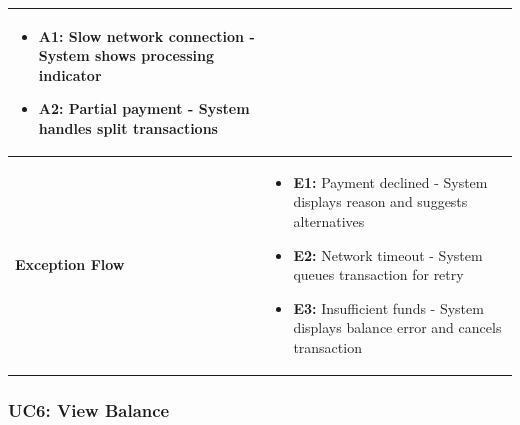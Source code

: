 \begin{longtable}{|p{3cm}|p{11cm}|}
\begin{itemize}[nosep,leftmargin=*]
\item \textbf{A1:} Slow network connection - System shows processing indicator
\item \textbf{A2:} Partial payment - System handles split transactions
\end{itemize} \\
\hline
\textbf{Exception Flow} & 
\begin{itemize}[nosep,leftmargin=*]
\item \textbf{E1:} Payment declined - System displays reason and suggests alternatives
\item \textbf{E2:} Network timeout - System queues transaction for retry
\item \textbf{E3:} Insufficient funds - System displays balance error and cancels transaction
\end{itemize} \\
\hline
\end{longtable}

\subsubsection{UC6: View Balance}

